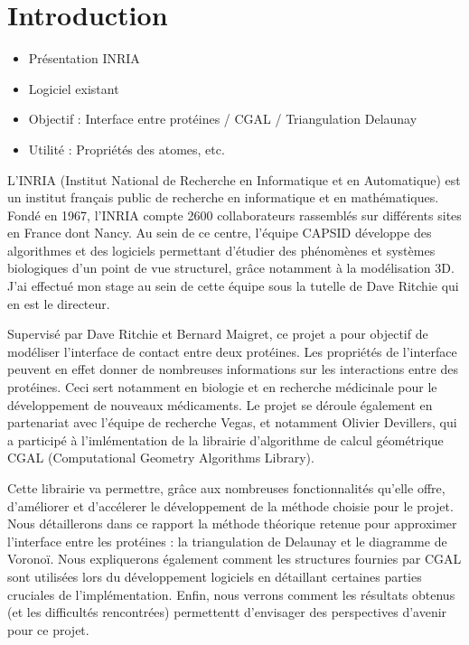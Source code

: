 \chapter*{Introduction}

\begin{itemize}
  \item Présentation INRIA
  \item Logiciel existant
  \item Objectif : Interface entre protéines / CGAL / Triangulation Delaunay
  \item Utilité : Propriétés des atomes, etc.
\end{itemize}

  L'INRIA (Institut National de Recherche en Informatique et en Automatique) est un
  institut français public de recherche en informatique et en mathématiques. Fondé
  en 1967, l'INRIA compte 2600 collaborateurs rassemblés sur différents sites en
  France dont Nancy. Au sein de ce centre, l'équipe CAPSID développe des algorithmes
  et des logiciels permettant d'étudier des phénomènes et systèmes biologiques
  d'un point de vue structurel, grâce notamment à la modélisation 3D. J'ai effectué
  mon stage au sein de cette équipe sous la tutelle de Dave Ritchie qui en est le
  directeur.

  Supervisé par Dave Ritchie et Bernard Maigret, ce projet a pour objectif de
  modéliser l'interface de contact entre deux protéines. Les propriétés de l'interface
  peuvent en effet donner de nombreuses informations sur les interactions entre
  des protéines. Ceci sert notamment en biologie et en recherche médicinale pour
  le développement de nouveaux médicaments.
  Le projet se déroule également en partenariat avec l'équipe de recherche Vegas, et
  notamment Olivier Devillers, qui a participé à l'imlémentation de
  la librairie d'algorithme de calcul géométrique CGAL (Computational Geometry
  Algorithms Library).

  Cette librairie va permettre, grâce aux nombreuses fonctionnalités qu'elle offre,
  d'améliorer et d'accélerer le développement de la méthode choisie pour le projet.
  Nous détaillerons dans ce rapport la méthode théorique retenue pour approximer l'interface
  entre les protéines : la triangulation de Delaunay et le diagramme de Voronoï. Nous
  expliquerons également comment les structures fournies par CGAL sont utilisées lors
  du développement logiciels en détaillant certaines parties cruciales de l'implémentation.
  Enfin, nous verrons comment les résultats obtenus (et les difficultés rencontrées)
  permettentt d'envisager des perspectives d'avenir pour ce projet.
